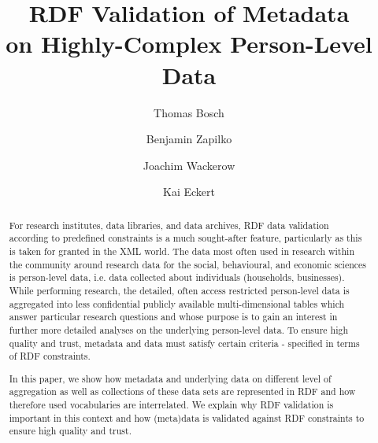 \documentclass{llncs}
\begin{document}
\renewcommand{\arraystretch}{1.3}
%
%
\title{RDF Validation of Metadata \\ on Highly-Complex Person-Level Data}
\subtitle{}

%
\author{Thomas Bosch \and Benjamin Zapilko \and Joachim Wackerow \and Kai Eckert}
%
\authorrunning{} %
%

\maketitle              %

\begin{abstract}
For research institutes, data libraries, and data archives,
RDF data validation according to predefined constraints is a much sought-after feature, 
particularly as this is taken for granted in the XML world.
The data most often used in research within the community around research data for the social, behavioural, and economic sciences is person-level data, i.e. data collected about individuals (households, businesses). 
While performing research, the detailed, often access restricted person-level
data is aggregated into less confidential publicly available multi-dimensional tables which answer particular research questions and whose purpose is to gain an interest in further more detailed analyses on the underlying person-level data.
To ensure high quality and trust, metadata and data must satisfy certain criteria - specified in terms of RDF constraints. 

In this paper, we show how metadata and underlying data on different level of aggregation as well as collections of these data sets are represented in RDF and how therefore used vocabularies are interrelated.
We explain why RDF validation is important in this context and how (meta)data is validated against RDF constraints to ensure high quality and trust. 

\end{abstract}
\end{document}
